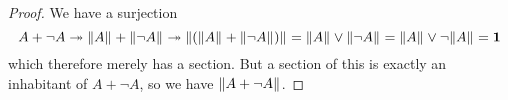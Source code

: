 \begin{proof}
  We have a surjection
\[
A + \neg A \twoheadrightarrow \Vert A\Vert_{} + \Vert \neg A\Vert_{} \twoheadrightarrow \Vert (\Vert A\Vert_{} + \Vert \neg A\Vert_{})\Vert_{} = \Vert A\Vert_{} \vee \Vert \neg A\Vert_{} = \Vert A\Vert_{} \vee \neg \Vert A\Vert_{} = \mathbf{1}
\]
which therefore merely has a section.
But a section of this is exactly an inhabitant of $A+\neg A$, so we have $\Vert A+\neg A\Vert_{}$.
\end{proof}

%
%
%
%

